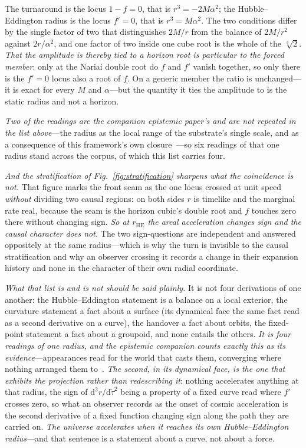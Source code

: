 \documentclass[11pt,a4paper]{article}
\theoremstyle{plain}
\theoremstyle{definition}
\theoremstyle{remark}
\newcommand{\dd}{\mathrm{d}}
\begin{document}
The turnaround is the locus $1-f=0$,
that is $r^{3}=-2M\alpha^{2}$; the Hubble--Eddington radius is the locus $f'=0$, that is $r^{3}=M\alpha^{2}$.
The two conditions differ by the single factor of two that distinguishes $2M/r$ from the balance of
$2M/r^{2}$ against $2r/\alpha^{2}$, and one factor of two inside one cube root is the whole of the
$\sqrt[3]{2}$. \emph{That the amplitude is thereby tied to a horizon \emph{root} is particular to the
forced member}: only at the Nariai double root do $f$ and $f'$ vanish together, so only there is the
$f'=0$ locus also a root of $f$. On a generic member the ratio is unchanged---it is exact for every $M$
and $\alpha$---but the quantity it ties the amplitude to is the static radius and not a horizon. 

\emph{Two of the readings are the companion epistemic paper's and are not repeated in the list above}---the
radius as the local range of the substrate's single scale, and as a consequence of this framework's own
closure~\cite{JanzenShadowExistence}---so six readings of that one radius stand across the corpus, of which
this list carries four.

\emph{And the stratification of Fig.~\ref{fig:stratification} sharpens what the coincidence is not.} That
figure marks the front seam as the one locus crossed at unit speed \emph{without} dividing two causal regions:
on both sides $r$ is timelike and the marginal rate real, because the seam is the horizon cubic's double root
and $f$ touches zero there without changing sign. \emph{So at $r_{\mathrm{HE}}$ the areal acceleration changes
sign and the causal character does not.} The two sign-questions are independent and answered oppositely at the
same radius---which is why the turn is invisible to the causal stratification and why an observer crossing it
records a change in their expansion history and none in the character of their own radial coordinate.

\emph{What that list is and is not should be said plainly.} It is not four derivations of one another: the
Hubble--Eddington statement is a balance on a local exterior, the curvature statement a fact about a surface
(its dynamical face the same fact read as a second derivative on a curve), the handover a fact about orbits,
the fixed-point statement a fact about a groupoid, and none entails the others. \emph{It is four readings of one
radius, and the epistemic companion counts exactly this as its evidence}---appearances read for the world that
casts them, converging where nothing arranged them to~\cite{JanzenShadowExistence}. \emph{The second, in its dynamical face, is the one
that exhibits the projection rather than redescribing it}: nothing accelerates anything at that radius, the
sign of $\dd^{2}r/\dd\tilde\tau^{2}$ being a property of a fixed curve read where $f'$ crosses zero, so what an
observer records as the onset of cosmic acceleration is the second derivative of a fixed function changing sign
along the path they are carried on. \emph{The universe accelerates when it reaches its own Hubble--Eddington
radius}---and that sentence is a statement about a curve, not about a force.
\end{document}
